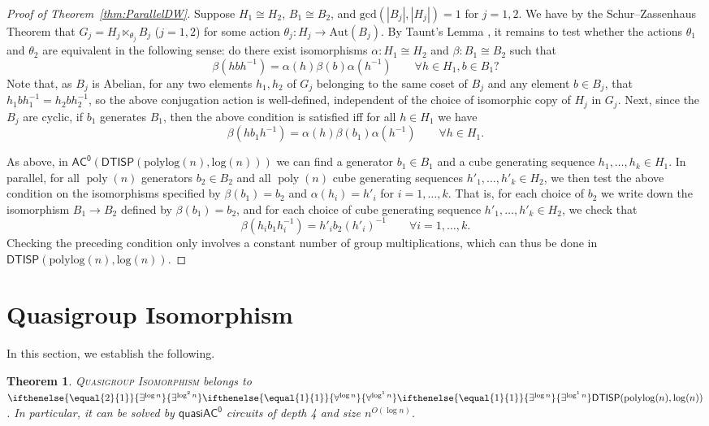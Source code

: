 \documentclass{article}
\newtheorem{theorem}{Theorem}\newtheorem{lemma}[theorem]{Lemma}\newtheorem{proposition}[theorem]{Proposition}\newtheorem{corollary}[theorem]{Corollary}\newtheorem{definition}[theorem]{Definition}\newtheorem{claim}[theorem]{Claim}\newtheorem{remark}[theorem]{Remark}\newtheorem{observation}[theorem]{Observation}\newtheorem{conjecture}[theorem]{Conjecture}\newtheorem{example}[theorem]{Example}
\newcommand{\algprobm}[1]{\textsc{#1}\xspace}
\newcommand{\betacc}[1]{\ifthenelse{\equal{#1}{1}}{\exists^{\log n}}{\exists^{\log^{#1}n}}} %
\newcommand{\alphacc}[1]{\ifthenelse{\equal{#1}{1}}{\forall^{\log n}}{\forall^{\log^{#1}n}}} %
\newcommand{\Oh}{O}
\DeclareMathOperator{\poly}{poly}
\newcommand*{\ComplexityClass}[1]{\ensuremath{\mathsf{#1}}\xspace}
\newcommand{\DTISP}{\ComplexityClass{DTISP}}
\newcommand{\DTISPpll}{\ensuremath{\DTISP(\mathrm{polylog}(n),\mathrm{log}(n))}\xspace}
\newcommand{\ACz}{\ComplexityClass{AC^0}}
\newcommand{\qACz}{\ComplexityClass{quasiAC^0}}
\begin{document}
\begin{proof}[Proof of Theorem~\ref{thm:ParallelDW}]
Suppose $H_{1} \cong H_{2}$, $B_{1} \cong B_{2}$, and $\text{gcd}(|B_{j}|, |H_{j}|) = 1$ for $j = 1,2$. We have by the Schur--Zassenhaus Theorem that $G_{j} = H_{j} \ltimes_{\theta_{j}} B_{j}$ ($j = 1,2$) for some action $\theta_j \colon H_j \to \text{Aut}(B_j)$. By Taunt's Lemma \cite{Taunt1955}, it remains to test whether the actions $\theta_{1}$ and $\theta_{2}$ are equivalent in the following sense: do there exist  isomorphisms $\alpha \colon H_1 \cong H_2$ and $\beta \colon B_1 \cong B_2$ such that
\[
\beta(h bh^{-1}) = \alpha(h) \beta(b) \alpha(h^{-1}) \qquad \forall h \in H_1, b \in B_1?
\]
Note that, as $B_{j}$ is Abelian, for any two elements $h_{1}, h_{2}$ of $G_{j}$ belonging to the same coset of $B_j$ and any element $b \in B_{j}$, that $h_{1}bh_{1}^{-1} = h_{2}bh_{2}^{-1}$, so the above conjugation action is well-defined, independent of the choice of isomorphic copy of $H_j$ in $G_j$. Next, since the $B_j$ are cyclic, if $b_1$ generates $B_1$, then the above condition is satisfied iff for all $h \in H_1$ we have
\[
\beta(h b_1 h^{-1}) = \alpha(h) \beta(b_1) \alpha(h^{-1}) \qquad \forall h \in H_1.
\]

As above, in $\ACz(\DTISPpll)$ we can find a generator $b_1 \in B_1$ and a cube generating sequence $h_1,\dotsc,h_k \in H_1$. In parallel, for all $\poly(n)$ generators $b_2 \in B_2$ and all $\poly(n)$ cube generating sequences $h'_1,\dotsc,h'_k \in H_2$, we then test the above condition on the isomorphisms specified by $\beta(b_1) = b_2$ and $\alpha(h_i) = h'_i$ for $i=1,\dotsc,k$. That is, for each choice of $b_2$ we write down the isomorphism $B_1 \to B_2$ defined by $\beta(b_1) = b_2$, and for each choice of cube generating sequence $h'_1,\dotsc,h'_k \in H_2$, we check that
\[
\beta(h_i b_1 h_i^{-1}) = h'_i b_2 (h'_i)^{-1} \qquad \forall i=1,\dotsc,k.
\]
Checking the preceding condition only involves a constant number of group multiplications, which can thus be done in $\DTISPpll$.\qedhere
\end{proof}





\section{Quasigroup Isomorphism} \label{sec:QuasigroupIsomorphism}

In this section, we establish the following.


\begin{theorem} \label{thm:QuasigroupIsoPolylogtime}
\algprobm{Quasigroup Isomorphism} belongs to $\betacc{2}\alphacc{1}\betacc{1}\DTISPpll$. In particular, it can be solved by $\qACz$ circuits of depth 4 and size $n^{\Oh(\log n)}$.
\end{theorem}
\end{document}
